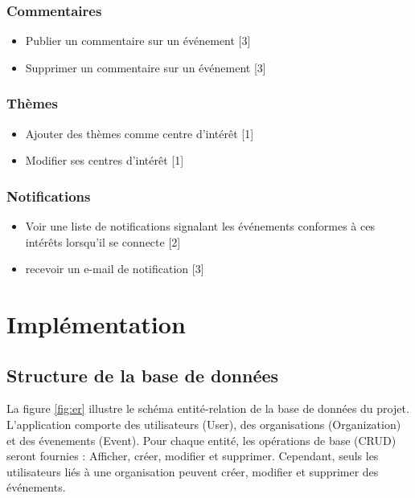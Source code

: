 \documentclass[11pt, a4paper, french, twoside]{article}
\begin{document}
			\subsubsection{Commentaires}
			\label{subsubsec:commentaires}
			
				\begin{itemize}
					\item Publier un commentaire sur un événement [3]
					\item Supprimer un commentaire sur un événement [3]
				\end{itemize}
			
			
			\subsubsection{Thèmes}
			\label{subsubsec:themes}
			
			\begin{itemize}
				\item Ajouter des thèmes comme centre d'intérêt [1]
				\item Modifier ses centres d'intérêt [1]
			\end{itemize}
		
			\subsubsection{Notifications}
			\label{subsubsec:notifications}
			
				\begin{itemize}
					\item Voir une liste de notifications signalant les événements conformes à ces intérêts lorsqu'il se connecte [2]
					\item recevoir un e-mail de notification [3] 
				\end{itemize}
			
	\section{Implémentation}
		\subsection{Structure de la base de données}
		\label{subsec:structure}
			La figure \ref{fig:er} illustre le schéma entité-relation de la base de données du projet. L'application comporte des utilisateurs (User), des organisations (Organization) et des évenements (Event). Pour chaque entité, les opérations de base (CRUD) seront fournies : Afficher, créer, modifier et supprimer. Cependant, seuls les utilisateurs liés à une organisation peuvent créer, modifier et supprimer des événements.
			
\end{document}
